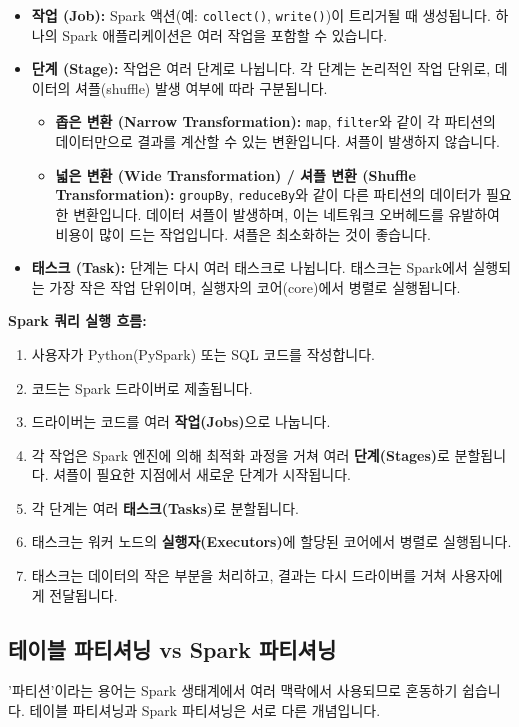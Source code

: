 \documentclass[11pt,a4paper]{article}
\theoremstyle{definition}
\begin{document}
\begin{itemize}
    \item \textbf{작업 (Job):} Spark 액션(예: \texttt{collect()}, \texttt{write()})이 트리거될 때 생성됩니다. 하나의 Spark 애플리케이션은 여러 작업을 포함할 수 있습니다.
    \item \textbf{단계 (Stage):} 작업은 여러 단계로 나뉩니다. 각 단계는 논리적인 작업 단위로, 데이터의 셔플(shuffle) 발생 여부에 따라 구분됩니다.
    \begin{itemize}
        \item \textbf{좁은 변환 (Narrow Transformation):} \texttt{map}, \texttt{filter}와 같이 각 파티션의 데이터만으로 결과를 계산할 수 있는 변환입니다. 셔플이 발생하지 않습니다.
        \item \textbf{넓은 변환 (Wide Transformation) / 셔플 변환 (Shuffle Transformation):} \texttt{groupBy}, \texttt{reduceBy}와 같이 다른 파티션의 데이터가 필요한 변환입니다. 데이터 셔플이 발생하며, 이는 네트워크 오버헤드를 유발하여 비용이 많이 드는 작업입니다. 셔플은 최소화하는 것이 좋습니다.
    \end{itemize}
    \item \textbf{태스크 (Task):} 단계는 다시 여러 태스크로 나뉩니다. 태스크는 Spark에서 실행되는 가장 작은 작업 단위이며, 실행자의 코어(core)에서 병렬로 실행됩니다.
\end{itemize}

\begin{examplebox}
\textbf{Spark 쿼리 실행 흐름:}
\begin{enumerate}
    \item 사용자가 Python(PySpark) 또는 SQL 코드를 작성합니다.
    \item 코드는 Spark 드라이버로 제출됩니다.
    \item 드라이버는 코드를 여러 \textbf{작업(Jobs)}으로 나눕니다.
    \item 각 작업은 Spark 엔진에 의해 최적화 과정을 거쳐 여러 \textbf{단계(Stages)}로 분할됩니다. 셔플이 필요한 지점에서 새로운 단계가 시작됩니다.
    \item 각 단계는 여러 \textbf{태스크(Tasks)}로 분할됩니다.
    \item 태스크는 워커 노드의 \textbf{실행자(Executors)}에 할당된 코어에서 병렬로 실행됩니다.
    \item 태스크는 데이터의 작은 부분을 처리하고, 결과는 다시 드라이버를 거쳐 사용자에게 전달됩니다.
\end{enumerate}
\end{examplebox}

\subsection{테이블 파티셔닝 vs Spark 파티셔닝}
'파티션'이라는 용어는 Spark 생태계에서 여러 맥락에서 사용되므로 혼동하기 쉽습니다. 테이블 파티셔닝과 Spark 파티셔닝은 서로 다른 개념입니다.
\end{document}
